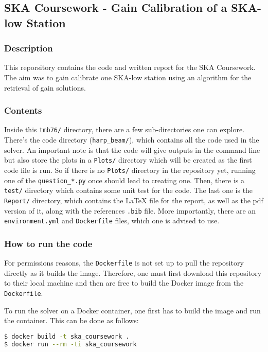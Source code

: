 \documentclass[12pt]{report} %
\begin{document}
\subsection{SKA Coursework - Gain Calibration of a SKA-low Station}

\subsubsection{Description}
This reporsitory contains the code and written report for the SKA Coursework. The aim was to gain calibrate one SKA-low station using an algorithm for the retrieval of gain solutions.

\subsubsection{Contents}

Inside this \texttt{tmb76/} directory, there are a few sub-directories one can explore. There's the code directory (\texttt{harp\_beam/}), which contains all the code used in the solver. An important note is that the code will give outputs in the command line but also store the plots in a \texttt{Plots/} directory which will be created as the first code file is run. So if there is no \texttt{Plots/} directory in the repository yet, running one of the \texttt{question\_*.py} once should lead to creating one. Then, there is a \texttt{test/} directory which contains some unit test for the code. The last one is the \texttt{Report/} directory, which contains the LaTeX file for the report, as well as the pdf version of it, along with the references \texttt{.bib} file.
More importantly, there are an \texttt{environment.yml} and \texttt{Dockerfile} files, which one is advised to use.

\subsubsection{How to run the code}

For permissions reasons, the \texttt{Dockerfile} is not set up to pull the repository directly as it builds the image. Therefore, one must first download this repository to their local machine and then are free to build the Docker image from the \texttt{Dockerfile}.

To run the solver on a Docker container, one first has to build the image and run the container. This can be done as follows:

\begin{lstlisting}[language=bash, caption={Building the Docker image and running the container.}]
$ docker build -t ska_coursework .
$ docker run --rm -ti ska_coursework
\end{lstlisting}
\end{document}
